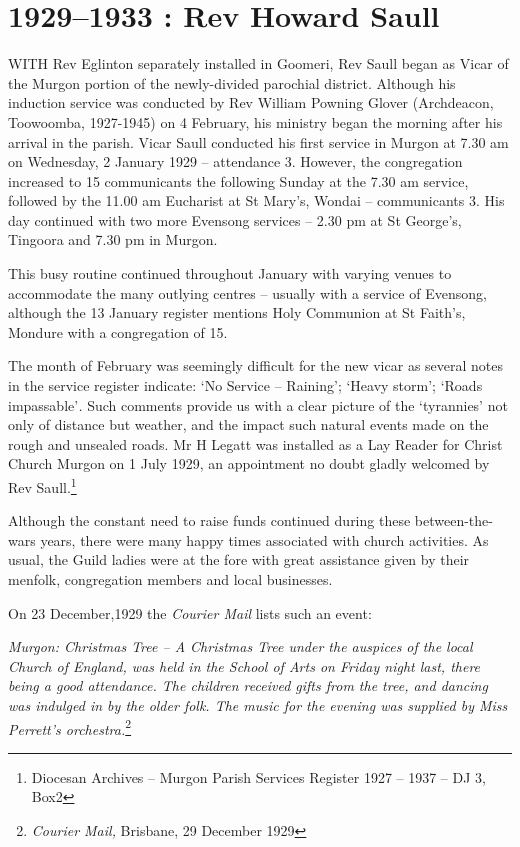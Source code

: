 \printendnotes[custom]
\setcounter{endnote}{0}
\chapter{1929--1933 : Rev Howard Saull}
\nobalance


\lettrine[lines=3]{W}{ITH}
 Rev Eglinton separately installed in Goomeri, Rev Saull began as Vicar of the Murgon portion of the newly-divided parochial district. Although his induction service was conducted by Rev William Powning Glover (Archdeacon, Toowoomba, 1927-1945) on 4 February, his ministry began the morning after his arrival in the parish. Vicar Saull conducted his first service in Murgon at 7.30 am on Wednesday, 2 January 1929 -- attendance 3. However, the congregation increased to 15 communicants the following Sunday at the 7.30 am service, followed by the 11.00 am Eucharist at St Mary's, Wondai -- communicants 3. His day continued with two more Evensong services -- 2.30 pm at St George's, Tingoora and 7.30 pm in Murgon.

This busy routine continued throughout January with varying venues to accommodate the many outlying centres -- usually with a service of Evensong, although the 13 January register mentions Holy Communion at St Faith's, Mondure with a congregation of 15.



The month of February was seemingly difficult for the new vicar as several notes in the service register indicate: `No Service -- Raining'; `Heavy storm'; `Roads impassable'\emph{.} Such comments provide us with a clear picture of the `tyrannies' not only of distance but weather, and the impact such natural events made on the rough and unsealed roads. Mr H Legatt was installed as a Lay Reader for Christ Church Murgon on 1 July 1929, an appointment no doubt gladly welcomed by Rev Saull.\footnote{Diocesan Archives -- Murgon Parish Services Register 1927 -- 1937 -- DJ 3, Box2}


Although the constant need to raise funds continued during these between-the-wars years, there were many happy times associated with church activities. As usual, the Guild ladies were at the fore with great assistance given by their menfolk, congregation members and local businesses.



On 23 December,1929 the \emph{Courier Mail} lists such an event:



\emph{Murgon: Christmas Tree -- A Christmas Tree under the auspices of the local Church of England, was held in the School of Arts on Friday night last, there being a good attendance. The children received gifts from the tree, and dancing was indulged in by the older folk. The music for the evening was supplied by Miss Perrett's orchestra.}\footnote{\emph{Courier Mail,} Brisbane, 29 December 1929}


